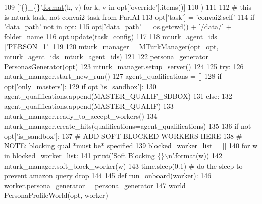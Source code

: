 \begin{DoxyCode}
{109         [\textcolor{stringliteral}{'\{\}\_\{\}'}.\hyperlink{namespaceparlai_1_1chat__service_1_1services_1_1messenger_1_1shared__utils_a32e2e2022b824fbaf80c747160b52a76}{format}(k, v) \textcolor{keywordflow}{for} k, v \textcolor{keywordflow}{in} opt[\textcolor{stringliteral}{'override'}].items()]
110     )
111 
112     \textcolor{comment}{#  this is mturk task, not convai2 task from ParlAI}
113     opt[\textcolor{stringliteral}{'task'}] = \textcolor{stringliteral}{'convai2:self'}
114     \textcolor{keywordflow}{if} \textcolor{stringliteral}{'data\_path'} \textcolor{keywordflow}{not} \textcolor{keywordflow}{in} opt:
115         opt[\textcolor{stringliteral}{'data\_path'}] = os.getcwd() + \textcolor{stringliteral}{'/data/'} + folder\_name
116     opt.update(task\_config)
117 
118     mturk\_agent\_ids = [\textcolor{stringliteral}{'PERSON\_1'}]
119 
120     mturk\_manager = MTurkManager(opt=opt, mturk\_agent\_ids=mturk\_agent\_ids)
121 
122     persona\_generator = PersonasGenerator(opt)
123     mturk\_manager.setup\_server()
124 
125     \textcolor{keywordflow}{try}:
126         mturk\_manager.start\_new\_run()
127         agent\_qualifications = []
128         \textcolor{keywordflow}{if} opt[\textcolor{stringliteral}{'only\_masters'}]:
129             \textcolor{keywordflow}{if} opt[\textcolor{stringliteral}{'is\_sandbox'}]:
130                 agent\_qualifications.append(MASTER\_QUALIF\_SDBOX)
131             \textcolor{keywordflow}{else}:
132                 agent\_qualifications.append(MASTER\_QUALIF)
133         mturk\_manager.ready\_to\_accept\_workers()
134         mturk\_manager.create\_hits(qualifications=agent\_qualifications)
135 
136         \textcolor{keywordflow}{if} \textcolor{keywordflow}{not} opt[\textcolor{stringliteral}{'is\_sandbox'}]:
137             \textcolor{comment}{# ADD SOFT-BLOCKED WORKERS HERE}
138             \textcolor{comment}{# NOTE: blocking qual *must be* specified}
139             blocked\_worker\_list = []
140             \textcolor{keywordflow}{for} w \textcolor{keywordflow}{in} blocked\_worker\_list:
141                 print(\textcolor{stringliteral}{'Soft Blocking \{\}\(\backslash\)n'}.\hyperlink{namespaceparlai_1_1chat__service_1_1services_1_1messenger_1_1shared__utils_a32e2e2022b824fbaf80c747160b52a76}{format}(w))
142                 mturk\_manager.soft\_block\_worker(w)
143                 time.sleep(0.1)  \textcolor{comment}{# do the sleep to prevent amazon query drop}
144 
145         \textcolor{keyword}{def }run\_onboard(worker):
146             worker.persona\_generator = persona\_generator
147             world = PersonaProfileWorld(opt, worker)
}
\end{DoxyCode}
